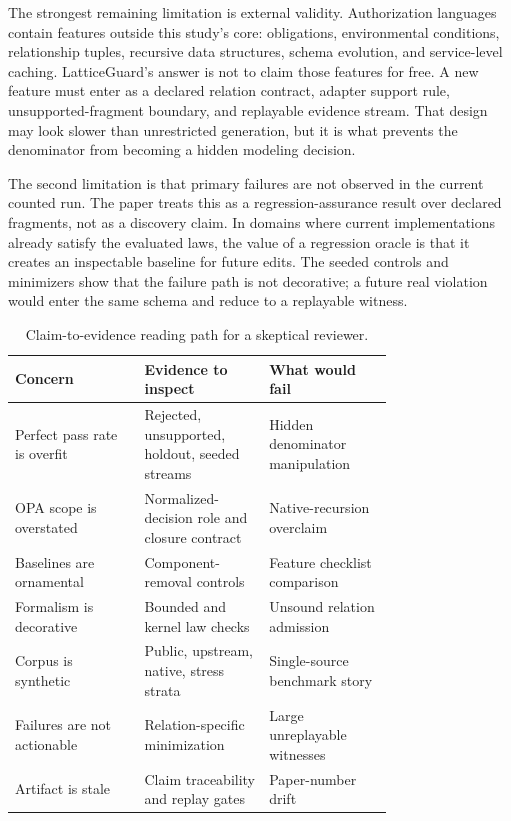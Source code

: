 \documentclass[10pt,conference]{IEEEtran}
\begin{document}
The strongest remaining limitation is external validity.  Authorization languages contain features outside this study's core: obligations, environmental conditions, relationship tuples, recursive data structures, schema evolution, and service-level caching.  LatticeGuard's answer is not to claim those features for free.  A new feature must enter as a declared relation contract, adapter support rule, unsupported-fragment boundary, and replayable evidence stream.  That design may look slower than unrestricted generation, but it is what prevents the denominator from becoming a hidden modeling decision.

The second limitation is that primary failures are not observed in the current counted run.  The paper treats this as a regression-assurance result over declared fragments, not as a discovery claim.  In domains where current implementations already satisfy the evaluated laws, the value of a regression oracle is that it creates an inspectable baseline for future edits.  The seeded controls and minimizers show that the failure path is not decorative; a future real violation would enter the same schema and reduce to a replayable witness.

\begin{table}[t]
\centering
\caption{Claim-to-evidence reading path for a skeptical reviewer.}
\label{tab:readingpath}
\begin{tabular}{p{0.26\linewidth}p{0.25\linewidth}p{0.24\linewidth}}
\toprule
Concern & Evidence to inspect & What would fail \\
\midrule
Perfect pass rate is overfit & Rejected, unsupported, holdout, seeded streams & Hidden denominator manipulation \\
OPA scope is overstated & Normalized-decision role and closure contract & Native-recursion overclaim \\
Baselines are ornamental & Component-removal controls & Feature checklist comparison \\
Formalism is decorative & Bounded and kernel law checks & Unsound relation admission \\
Corpus is synthetic & Public, upstream, native, stress strata & Single-source benchmark story \\
Failures are not actionable & Relation-specific minimization & Large unreplayable witnesses \\
Artifact is stale & Claim traceability and replay gates & Paper-number drift \\
\bottomrule
\end{tabular}
\end{table}
\end{document}
